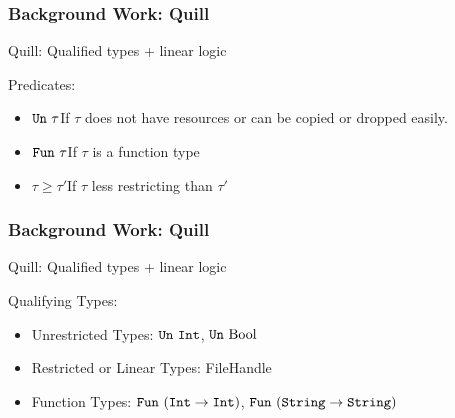 \begin{frame}
  \frametitle{Background Work: Quill}
  \begin{center}
    Quill\citep{morris_best_2016}: {\color{blue}Qu}al{\color{blue}i}fied types + {\color{blue}l}inear {\color{blue}l}ogic\\
  \end{center}
  Predicates:
  \begin{itemize}
  \item $\texttt{Un}\ \tau$\quad If $\tau$ does not have resources
    or can be copied or dropped easily.
  \item $\texttt{Fun}\ \tau$\quad If $\tau$ is a function type
  \item $\tau \geq \tau'$\quad If $\tau$ less restricting than $\tau'$
  \end{itemize}
\end{frame}

\begin{frame}[fragile, c]
  \frametitle{Background Work: Quill}
  \begin{center}
    Quill\citep{morris_best_2016}: {\color{blue}Qu}al{\color{blue}i}fied types + {\color{blue}l}inear {\color{blue}l}ogic\\
  \end{center}
  Qualifying Types:
  \begin{itemize}
  \item Unrestricted Types: $\texttt{Un}\ \texttt{Int}$, $\texttt{Un}\ \text{Bool}$
  \item Restricted or Linear Types: FileHandle
  \item Function Types: $\texttt{Fun}\ (\texttt{Int} \rightarrow \texttt{Int})$,
    $\texttt{Fun}\ (\texttt{String} \rightarrow \texttt{String})$
  \end{itemize}
\end{frame}

